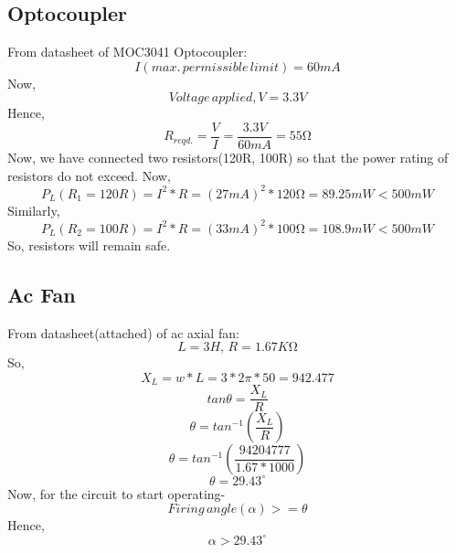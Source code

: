              \subsection{Optocoupler}
             From datasheet of MOC3041 Optocoupler:
             \begin{equation}
             I(max.\,permissible\,limit)=60mA
             \end{equation}
             Now, \\
             \begin{equation}
             Voltage\,applied,V=3.3V
             \end{equation}
             Hence,
             \begin{equation}
             R_{reqd.}=\frac{V}{I}=\frac{3.3V}{60mA}=55{\si\ohm}
             \end{equation}
             Now, we have connected two resistors(120R, 100R) so that the power rating of resistors do not exceed. 
             Now,
             \begin{equation}
             P_L(R_1=120R)=I^2*R=(27mA)^2*120{\si\ohm}=89.25mW<500mW
             \end{equation}
             Similarly,
             \begin{equation}
             P_L(R_2=100R)=I^2*R=(33mA)^2*100{\si\ohm}=108.9mW<500mW
             \end{equation}
             So, resistors will remain safe.
             \subsection{Ac Fan}
             From datasheet(attached) of ac axial fan:
             \begin{equation}
            L=3H,\,R=1.67K{\si\ohm}
             \end{equation}
             So,
             \begin{equation}
             X_L=w*L=3*2\pi*50=942.477
             \end{equation}
             \begin{equation}
             tan{\theta}=\frac{X_L}{R}
             \end{equation}
             \begin{equation}
             \theta=tan^{-1}(\frac{X_L}{R})
             \end{equation}
             \begin{equation}
             \theta=tan^{-1}(\frac{94204777}{1.67*1000})
             \end{equation}
             \begin{equation}
             \theta=29.43^\circ
             \end{equation}
             Now, for the circuit to start operating-\\
             \begin{equation}
             Firing\,angle(\alpha)>=\theta 
             \end{equation}
             Hence,
             \begin{equation}   
             \alpha>29.43^\circ
             \end{equation}
               
